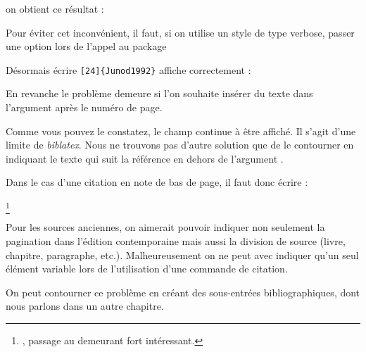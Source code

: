 on obtient ce résultat :

\begin{quotation}
\end{quotation}



Pour éviter cet inconvénient, il faut, si on utilise un style de type verbose, passer une option lors de l'appel au package 

\begin{latexcode}
\usepackage[citestyle=verbose,citepages=omit]{biblatex}
\end{latexcode}

Désormais écrire \verb|[24]{Junod1992}|
affiche correctement :

\begin{quotation}
\cite[24]{Junod1992}
\end{quotation}

En revanche le problème demeure si l'on souhaite insérer du texte dans l'argument  après le numéro de page.

\begin{latexcode}
\cite[\pno~24, passage au demeurant fort intéressant.]{Junod1992}
\end{latexcode}

\begin{quotation}
\cite[\pno~24, passage au demeurant fort intéressant.]{Junod1992}
\end{quotation}

Comme vous pouvez le constatez, le champ  continue à être affiché. Il s'agit d'une limite de \emph{biblatex}. Nous ne trouvons pas d'autre solution que de le contourner en indiquant le texte qui suit la référence en dehors de l'argument . 

Dans le cas d'une citation en note de bas de page, il faut donc écrire :

\begin{latexcode}
\footnote{\cite[24]{Junod1992}, passage au demeurant fort intéressant.}
\end{latexcode}

\begin{attention}
Pour les sources anciennes, on aimerait pouvoir indiquer non seulement la pagination dans l'édition contemporaine mais aussi la division de source (livre, chapitre, paragraphe, etc.). Malheureusement on ne peut avec  indiquer qu'un seul élément variable lors de l'utilisation d'une commande de citation.

On peut contourner ce problème en créant des sous-entrées bibliogra\-phiques, dont nous parlons dans un autre chapitre. 
\end{attention}



